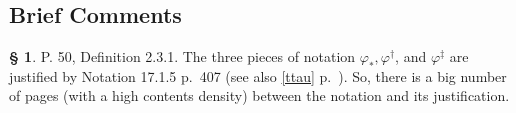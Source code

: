 \documentclass[12pt]{article}
\theoremstyle{remark}
\theoremstyle{definition}
\newtheorem{s}[thm]{\S}
\newcommand{\nn}{\noindent}
\newcommand{\C}{\mathcal C}
\DeclareMathOperator*{\co}{colim}
\DeclareMathOperator{\hy}{h}
\DeclareMathOperator{\Hom}{Hom}%
\begin{document}
\subsection{Brief Comments}
%
\begin{s}\label{231}
P. 50, Definition 2.3.1. The three pieces of notation $\varphi_*,\varphi^\dagger$, and $\varphi^\ddagger$ are justified by Notation 17.1.5 p.~407 (see also \eqref{ttau} p.~\pageref{ttau}). So, there is a big number of pages (with a high contents density) between the notation and its justification.
\end{s}
%
%
\begin{comment}
\nn $*$ P.~63, Notation 2.7.2. Recall the setting: The diagram
$$
\begin{tikzcd}
\C\ar{d}[swap]{\hy_\C}\ar{r}{F}&\C'\ar{d}{\hy_{\C'}}\\ 
\C^\wedge\ar{r}[swap]{\widehat F}&\C'^\wedge
\end{tikzcd}
$$ 
commutes up to isomorphism, $\C$ and $\C'$ are small, and we have 
$$
\widehat F(A)(V)\simeq\co_{(U\to A)\in\C_A}\Hom_{\C'}(V,F(U)).
$$ 
The purpose of this comment is just to note that we also have by Corollary 2.4.6 p.~56 
\begin{equation}\label{272}
\widehat F(A)(V)\simeq\co_{(U\to F(V))\in\C^U}A(U).
\end{equation}
\end{comment}
%
\end{document}
